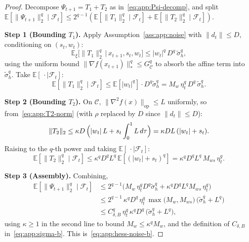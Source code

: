 \documentclass{article}
\theoremstyle{plain}
\theoremstyle{definition}
\theoremstyle{remark}
\begin{document}
\begin{proof}
Decompose $\Psi_{t+1} = T_1 + T_2$ as in~\eqref{eq:app:Psi-decomp}, and
split $\mathbb{E}[\|\Psi_{t+1}\|_2^q \mid \mathcal{F}_t] \leq
2^{q-1}(\mathbb{E}[\|T_1\|_2^q \mid \mathcal{F}_t] + \mathbb{E}[\|T_2\|_2^q
\mid \mathcal{F}_t])$.

\smallskip\noindent\textbf{Step 1 (Bounding $T_1$).}
Apply Assumption~\ref{ass:app:noise} with $\|d_t\| \leq D$, conditioning
on $(s_t, w_t)$:
\[
  \mathbb{E}_\xi\bigl[\|T_1\|_2^q \,\big|\, x_{t+1}, s_t, w_t\bigr]
  \leq |w_t|^q\, D^q\, \tilde\sigma_h^q,
\]
using the uniform bound $\|\nabla f(x_{t+1})\|_*^q \leq G_\mathcal{C}^q$
to absorb the affine term into $\tilde\sigma_h^q$. Take $\mathbb{E}[\,\cdot
\mid \mathcal{F}_t]$:
\begin{equation}
  \mathbb{E}[\|T_1\|_2^q \mid \mathcal{F}_t]
  \leq \mathbb{E}[|w_t|^q]\cdot D^q \tilde\sigma_h^q
  = M_w\, \eta_t^q\, D^q\, \tilde\sigma_h^q.
  \label{eq:app:T1-b}
\end{equation}

\smallskip\noindent\textbf{Step 2 (Bounding $T_2$).}
On $\mathcal{C}$, $\|\nabla^2 f(x)\|_{\mathrm{op}} \leq L$ uniformly, so
from~\eqref{eq:app:T2-norm} (with $\rho$ replaced by $D$ since $\|d_t\|
\leq D$):
\[
  \|T_2\|_2
  \leq \kappa D\,\Bigl(|w_t|\, L + s_t \int_0^1 L\, d\tau\Bigr)
  = \kappa D L\, (|w_t| + s_t).
\]
Raising to the $q$-th power and taking $\mathbb{E}[\,\cdot \mid
\mathcal{F}_t]$:
\begin{equation}
  \mathbb{E}[\|T_2\|_2^q \mid \mathcal{F}_t]
  \leq \kappa^q D^q L^q\, \mathbb{E}[(|w_t|+s_t)^q]
  = \kappa^q D^q L^q\, M_{ws}\, \eta_t^q.
  \label{eq:app:T2-b}
\end{equation}

\smallskip\noindent\textbf{Step 3 (Assembly).}
Combining,
\begin{align*}
  \mathbb{E}[\|\Psi_{t+1}\|_2^q \mid \mathcal{F}_t]
  &\leq 2^{q-1}\bigl(M_w\, \eta_t^q D^q \tilde\sigma_h^q
    + \kappa^q D^q L^q M_{ws}\, \eta_t^q\bigr)
  \\
  &\leq 2^{q-1}\, \kappa^q D^q\, \eta_t^q\, \max\bigl(M_w, M_{ws}\bigr)\,
    \bigl(\tilde\sigma_h^q + L^q\bigr)
  \\
  &\leq C_{\delta,B}^q\, \eta_t^q\, \kappa^q D^q\,
    \bigl(\tilde\sigma_h^q + L^q\bigr),
\end{align*}
using $\kappa \geq 1$ in the second line to bound $M_w \leq \kappa^q
M_w$, and the definition of $C_{\delta,B}$ in~\eqref{eq:app:sigma-b}.
This is~\eqref{eq:app:hess-noise-b}.
\end{proof}
\end{document}
